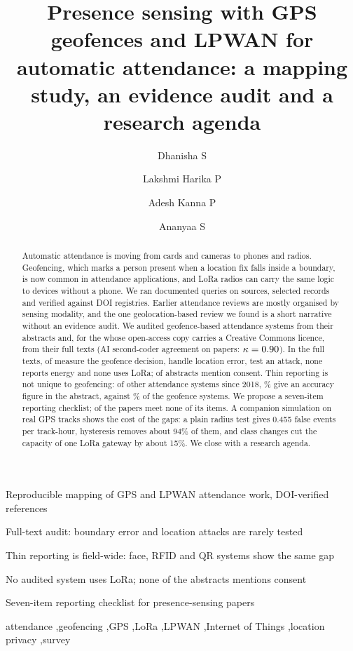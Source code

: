 \documentclass[preprint,12pt]{elsarticle}
\begin{document}
\begin{frontmatter}
\title{Presence sensing with GPS geofences and LPWAN for automatic attendance: a mapping study, an evidence audit and a research agenda}
\author[vit]{Dhanisha S}
\author[vit]{Lakshmi Harika P}
\author[vit]{Adesh Kanna P}
\author[vit]{Ananyaa S}

\begin{abstract}
Automatic attendance is moving from cards and cameras to phones and radios. Geofencing, which marks a person present when a location fix falls inside a boundary, is now common in attendance applications, and LoRa radios can carry the same logic to devices without a phone. We ran \nQueriesAll{} documented queries on \nSources{} sources, selected \nSelected{} records and verified \nVerified{} against DOI registries. Earlier attendance reviews are mostly organised by sensing modality, and the one geolocation-based review we found is a short narrative without an evidence audit. We audited \nAudit{} geofence-based attendance systems from their abstracts and, for the \ftN{} whose open-access copy carries a Creative Commons licence, from their full texts (AI second-coder agreement on \agN{} papers: $\kappa=0.90$). In the full texts, \ftQtwo{} of \ftN{} measure the geofence decision, \ftQone{} handle location error, \ftQthree{} test an attack, none reports energy and none uses LoRa; \hfConsent{} of \hfN{} abstracts mention consent. Thin reporting is not unique to geofencing: of \nOthersRecent{} other attendance systems since 2018, \cmpOacc\% give an accuracy figure in the abstract, against \cmpGacc\% of the geofence systems. We propose a seven-item reporting checklist; \ftScoreZero{} of the \ftN{} papers meet none of its items. A companion simulation on real GPS tracks shows the cost of the gaps: a plain radius test gives 0.455 false events per track-hour, hysteresis removes about 94\% of them, and class changes cut the capacity of one LoRa gateway by about 15\%. We close with a research agenda.
\end{abstract}

\begin{highlights}
\item Reproducible mapping of GPS and LPWAN attendance work, DOI-verified references
\item Full-text audit: boundary error and location attacks are rarely tested
\item Thin reporting is field-wide: face, RFID and QR systems show the same gap
\item No audited system uses LoRa; none of the abstracts mentions consent
\item Seven-item reporting checklist for presence-sensing papers
\end{highlights}

\begin{keyword}
attendance \sep geofencing \sep GPS \sep LoRa \sep LPWAN \sep Internet of Things \sep location privacy \sep survey
\end{keyword}
\end{frontmatter}
\end{document}
